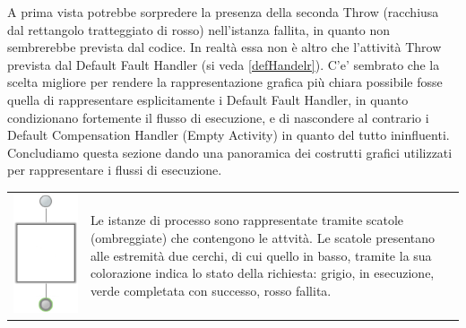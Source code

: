 A prima vista potrebbe sorpredere la presenza della seconda Throw (racchiusa
dal rettangolo tratteggiato di rosso) nell'istanza fallita, in quanto non
sembrerebbe prevista dal codice. In realtà essa non è altro che l'attività
Throw prevista dal Default Fault Handler (si veda \ref{defHandelr}). C'e'
sembrato che la scelta migliore per rendere la rappresentazione grafica più chiara possibile fosse
quella di rappresentare esplicitamente i Default Fault Handler, in quanto
condizionano fortemente il flusso di esecuzione, e di nascondere al contrario i
Default Compensation Handler (Empty Activity) in quanto del tutto ininfluenti.
\\

Concludiamo questa sezione dando una panoramica dei costrutti grafici utilizzati
per rappresentare i flussi di esecuzione.
\vspace{0.3cm}

\begin{tabular}{cp{}}
\includegraphics[scale=0.48]{blide/dia/BlideInst} &
\parbox[b][4cm][t]{0.6 \textwidth}{Le istanze di processo
sono rappresentate tramite scatole (ombreggiate) che contengono le attvità.
Le scatole presentano alle estremità due cerchi, di cui quello in basso,
tramite la sua colorazione indica lo stato della richiesta: grigio, in
esecuzione, verde completata con successo, rosso fallita.}
\\
\end{tabular}

